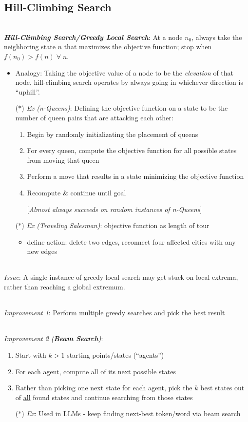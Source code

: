 \documentclass[12pt]{extarticle}
\theoremstyle{definition}
\theoremstyle{remark}
\newcommand{\pstart}[0]{\noindent}
\newcommand{\newp}[0]{~\\ \pstart}
\newcommand{\term}[1]{\noindent\textbf{\textit{#1}}}
\begin{document}
\subsection{Hill-Climbing Search}
~\\ \pstart
\term{Hill-Climbing Search/Greedy Local Search}: At a node $n_0$, always take the neighboring state $n$ that maximizes the objective function; stop when $f(n_0)>f(n)\;\forall\;n$. \begin{itemize}
    \item Analogy: Taking the objective value of a node to be the \textit{elevation} of that node, hill-climbing search operates by always going in whichever direction is ``uphill''.
    \item[($\ast$)] \textit{Ex (n-Queens)}: Defining the objective function on a state to be the number of queen pairs that are attacking each other: \begin{enumerate}
        \item Begin by randomly initializating the placement of queens
        \item For every queen, compute the objective function for all possible states from moving that queen
        \item Perform a move that results in a state minimizing the objective function
        \item Recompute \& continue until goal
        
        [\textit{Almost always succeeds on random instances of n-Queens}]
    \end{enumerate}
    \item[($\ast$)] \textit{Ex (Traveling Salesman)}: objective function as length of tour \begin{itemize}
        \item define action: delete two edges, reconnect four affected cities with any new edges
    \end{itemize}
\end{itemize}

\newp
\textit{Issue}: A single instance of greedy local search may get stuck on local extrema, rather than reaching a global extremum.

\newp
\textit{Improvement 1}: Perform multiple greedy searches and pick the best result

\newp
\textit{Improvement 2 (\term{Beam Search})}:\begin{enumerate}
    \item Start with $k>1$ starting points/states (``agents'')
    \item For each agent, compute all of its next possible states
    \item Rather than picking one next state for each agent, pick the $k$ best states out of \ul{all} found states and continue searching from those states
    \item[($\ast$)] \textit{Ex}: Used in LLMs - keep finding next-best token/word via beam search
\end{enumerate}
\end{document}

